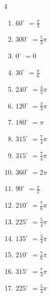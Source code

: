 \begin{multicols}{4}
\begin{enumerate}
  \item $\displaystyle 60^{\circ}$
        $\displaystyle =\frac{\pi}{3}$

  \item $\displaystyle 300^{\circ}$
        $\displaystyle =\frac{5}{3}\pi$

  \item $\displaystyle 0^{\circ}$
        $\displaystyle =0$

  \item $\displaystyle 30^{\circ}$
        $\displaystyle =\frac{\pi}{6}$

  \item $\displaystyle 240^{\circ}$
        $\displaystyle =\frac{4}{3}\pi$

  \item $\displaystyle 120^{\circ}$
        $\displaystyle =\frac{2}{3}\pi$

  \item $\displaystyle 180^{\circ}$
        $\displaystyle =\pi$

  \item $\displaystyle 315^{\circ}$
        $\displaystyle =\frac{7}{4}\pi$

\columnbreak %

  \item $\displaystyle 315^{\circ}$
        $\displaystyle =\frac{7}{4}\pi$

  \item $\displaystyle 360^{\circ}$
        $\displaystyle =2\pi$

  \item $\displaystyle 90^{\circ}$
        $\displaystyle =\frac{\pi}{2}$

  \item $\displaystyle 210^{\circ}$
        $\displaystyle =\frac{7}{6}\pi$

  \item $\displaystyle 225^{\circ}$
        $\displaystyle =\frac{5}{4}\pi$

  \item $\displaystyle 135^{\circ}$
        $\displaystyle =\frac{3}{4}\pi$

  \item $\displaystyle 210^{\circ}$
        $\displaystyle =\frac{7}{6}\pi$

  \item $\displaystyle 315^{\circ}$
        $\displaystyle =\frac{7}{4}\pi$

  \item $\displaystyle 225^{\circ}$
        $\displaystyle =\frac{5}{4}\pi$


\end{enumerate}
\end{multicols}
